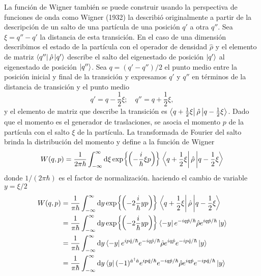 La función de Wigner también se puede construir usando la perspectiva de funciones de onda como Wigner (1932) la describió originalmente a partir de la descripción de un salto de una partícula de una posición $q'$ a otra $q''$. Sea $\xi = q'' -q'$ la distancia de esta transición. En el caso de una dimensión describimos el estado de la partícula con el operador de densidad $\hat{\rho}$ y el elemento de matriz $\bra{q''}\hat{\rho}\ket{q'}$ describe el salto del eigenestado de posición $\ket{q'}$ al eigenestado de posición $\ket{q''}$. Sea $q = (q'-q'')/2$ el punto medio entre la posición inicial y final de la transición y expresamos $q'$ y $q''$ en términos de la distancia de transición y el punto medio
\begin{equation}
  q' = q - \frac{1}{2}\xi; \quad q'' = q + \frac{1}{2}\xi,
\end{equation}
y el elemento de matriz que describe la transición es $\bra{q + \frac{1}{2}\xi}\hat{\rho}\ket{q - \frac{1}{2}\xi}$. Dado que el momento es el generador de traslaciones, se asocia el momento $p$ de la partícula con el salto $\xi$ de la partícula. La transformada de Fourier del salto brinda la distribución del momento y define a la función de Wigner
\begin{equation}
  W(q,p) = \frac{1}{2\pi\hbar} \int_{-\infty}^{\infty} \text{d}\xi \exp{\left( -\frac{i}{\hbar}\xi p \right)} \bra{q + \frac{1}{2}\xi}\hat{\rho}\ket{q - \frac{1}{2}\xi}
\end{equation}
donde $1/(2\pi\hbar)$ es el factor de normalización. haciendo el cambio de variable $y = \xi/2$
\begin{align}
  W(q,p) & = \frac{1}{\pi\hbar} \int_{-\infty}^{\infty} \text{d}y \exp{\left( -2\frac{i}{\hbar}y p \right)} \bra{q + \frac{1}{2}\xi}\hat{\rho}\ket{q - \frac{1}{2}\xi}                                  \nonumber \\
         & = \frac{1}{\pi\hbar} \int_{-\infty}^{\infty} \text{d}y \exp{\left( -2\frac{i}{\hbar}y p \right)} \bra{-y}e^{-iq\hat{p}/\hbar}  \hat{\rho} e^{iq\hat{p}/\hbar} \ket{y}                        \nonumber \\
         & = \frac{1}{\pi\hbar} \int_{-\infty}^{\infty} \text{d}y \bra{-y} e^{ip\hat{q}/\hbar} e^{-iq\hat{p}/\hbar}  \hat{\rho} e^{iq\hat{p}} e^{-ip\hat{q}/\hbar} \ket{y}                              \nonumber \\
         & = \frac{1}{\pi\hbar} \int_{-\infty}^{\infty} \text{d}y \bra{y} (-1)^{\hat{a}^\dagger\hat{a}} e^{ip\hat{q}/\hbar} e^{-iq\hat{p}/\hbar}  \hat{\rho} e^{iq\hat{p}} e^{-ip\hat{q}/\hbar} \ket{y}
\end{align}
